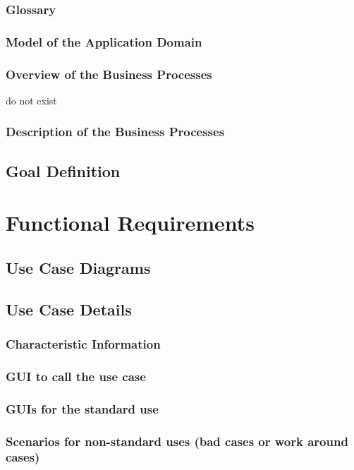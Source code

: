 \documentclass[12pt]{article}
\theoremstyle{definition}
\begin{document}
\pagebreak

\subsubsection{Glossary}




\pagebreak
\subsubsection{Model of the Application Domain}


\subsubsection{Overview of the Business Processes}
do not exist

\subsubsection{Description of the Business Processes}

\subsection{Goal Definition}
\pagebreak
\section{Functional Requirements}
\subsection{Use Case Diagrams}
\subsection{Use Case Details}
\subsubsection{Characteristic Information}
\subsubsection{GUI to call the use case}
\subsubsection{GUIs for the standard use}
\subsubsection{Scenarios for non-standard uses (bad cases or work around cases)}
\end{document}
